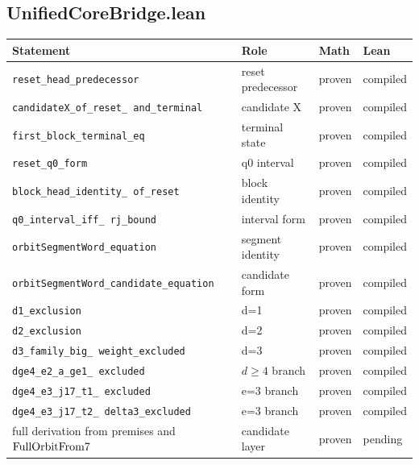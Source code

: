 \subsection{UnifiedCoreBridge.lean}

\begin{center}
\scriptsize
\begin{tabular}{@{}p{}p{}p{}p{}@{}}
\toprule
Statement & Role & Math & Lean \\
\midrule
\texttt{reset\_\allowbreak head\_\allowbreak predecessor} & reset
  predecessor & proven & compiled \\
\texttt{candidateX\_\allowbreak of\_\allowbreak reset\_\allowbreak
and\_\allowbreak terminal} & candidate X & proven & compiled \\
\texttt{first\_\allowbreak block\_\allowbreak terminal\_\allowbreak eq} &
  terminal state & proven & compiled \\
\texttt{reset\_\allowbreak q0\_\allowbreak form} & q0 interval &
  proven & compiled \\
\texttt{block\_\allowbreak head\_\allowbreak identity\_\allowbreak
of\_\allowbreak reset} & block identity & proven & compiled \\
\texttt{q0\_\allowbreak interval\_\allowbreak iff\_\allowbreak
rj\_\allowbreak bound} & interval form & proven & compiled \\
\texttt{orbitSegmentWord\_\allowbreak equation} & segment identity &
  proven & compiled \\
\texttt{orbitSegmentWord\_\allowbreak candidate\_\allowbreak equation} &
  candidate form & proven & compiled \\
\texttt{d1\_\allowbreak exclusion} & d=1 & proven & compiled \\
\texttt{d2\_\allowbreak exclusion} & d=2 & proven & compiled \\
\texttt{d3\_\allowbreak family\_\allowbreak big\_\allowbreak
weight\_\allowbreak excluded} & d=3 & proven & compiled \\
\texttt{dge4\_\allowbreak e2\_\allowbreak a\_\allowbreak ge1\_\allowbreak
excluded} & $d\ge4$ branch & proven & compiled \\
\texttt{dge4\_\allowbreak e3\_\allowbreak j17\_\allowbreak t1\_\allowbreak
excluded} & e=3 branch & proven & compiled \\
\texttt{dge4\_\allowbreak e3\_\allowbreak j17\_\allowbreak t2\_\allowbreak
delta3\_\allowbreak excluded} & e=3 branch & proven & compiled \\
full derivation from premises and $\mathrm{FullOrbitFrom7}$ & candidate layer &
  proven & pending \\
\bottomrule
\end{tabular}
\end{center}

